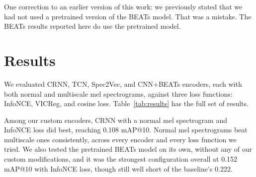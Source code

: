 \documentclass[11pt]{article}
\begin{document}
One correction to an earlier version of this work: we previously stated that we had not used a
pretrained version of the BEATs model. That was a mistake. The BEATs results reported here do use
the pretrained model.

\section{Results}

We evaluated CRNN, TCN, Spec2Vec, and CNN+BEATs encoders, each with both normal and multiscale mel
spectrograms, against three loss functions: InfoNCE, VICReg, and cosine loss. Table~\ref{tab:results}
has the full set of results.

Among our custom encoders, CRNN with a normal mel spectrogram and InfoNCE loss did best, reaching
0.108 mAP@10. Normal mel spectrograms beat multiscale ones consistently, across every encoder and
every loss function we tried. We also tested the pretrained BEATs model on its own, without any of
our custom modifications, and it was the strongest configuration overall at 0.152 mAP@10 with
InfoNCE loss, though still well short of the baseline's 0.222.
\end{document}
